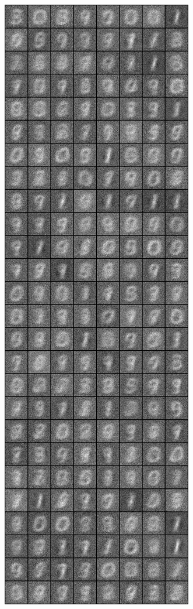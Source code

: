\begin{figure}
\includegraphics[width=\picwidth\columnwidth]{figures/supplementary/mnist/image_500.png}

\end{figure}
